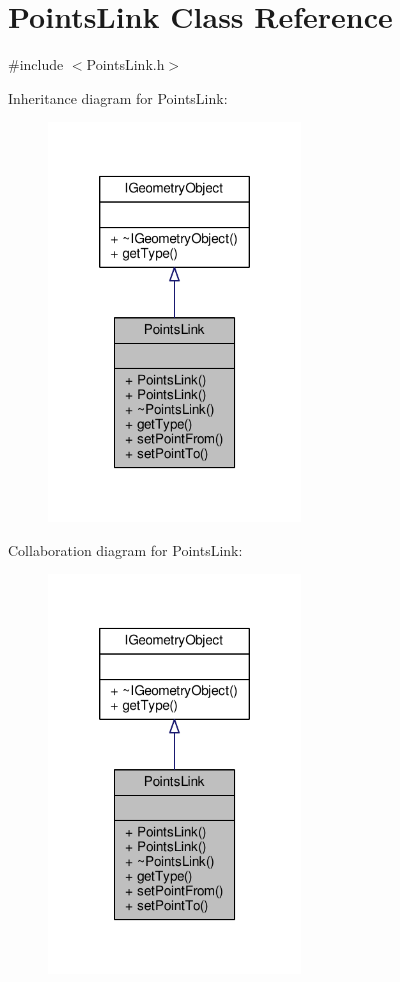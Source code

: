 \hypertarget{class_points_link}{\section{Points\-Link Class Reference}
\label{class_points_link}
}


{\ttfamily \#include $<$Points\-Link.\-h$>$}



Inheritance diagram for Points\-Link\-:\nopagebreak
\begin{figure}[H]
\begin{center}
\leavevmode
\includegraphics[width=190pt]{class_points_link__inherit__graph}
\end{center}
\end{figure}


Collaboration diagram for Points\-Link\-:
\nopagebreak
\begin{figure}[H]
\begin{center}
\leavevmode
\includegraphics[width=190pt]{class_points_link__coll__graph}
\end{center}
\end{figure}
